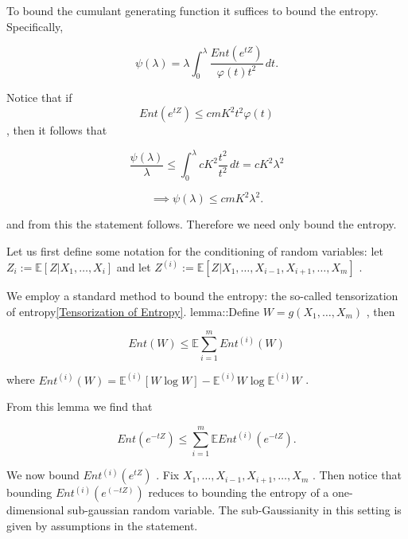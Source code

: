 \documentclass{article}
\begin{document}
\begin{lemma}
\label{Herbst's Argument}
To bound the cumulant generating function it suffices to bound the entropy. Specifically,


\begin{equation*}
\psi(\lambda) =\lambda \int_0^\lambda  \frac{Ent(e^{tZ})}{\varphi(t)t^2}  \, dt.
\end{equation*}


\end{lemma}
 Notice that if  
\begin{equation*}
Ent(e^{tZ}) \leq cmK^2 t^2 \varphi(t)
\end{equation*}
 , then it follows that


\begin{equation*}
\frac{\psi(\lambda)}{\lambda} \leq \int _0^\lambda cK^2 \frac{t^2}{t^2} \, dt = cK^2 \lambda^2
\end{equation*}


\begin{equation*}
\implies \psi(\lambda) \leq cmK^2 \lambda^2.
\end{equation*}

and from this the statement follows. Therefore we need only bound the entropy.

Let us first define some notation for the conditioning of random variables: let  $Z_i := \mathbb{E}[Z |X_1, \dots, X_i]$  and let  $Z^{(i)}:= \mathbb{E}[Z|X_1, \dots, X_{i-1}, X_{i+1}, \dots, X_m]$ .

We employ a standard method to bound the entropy: the so-called tensorization of entropy\ref{Tensorization of Entropy}. lemma::Define  $W = g(X_1, \dots, X_m)$ , then


\begin{equation*}
Ent(W) \leq \mathbb{E} \sum_{i=1}^m Ent^{(i)}(W)
\end{equation*}

where  $Ent^{(i)}(W) = \mathbb{E}^{(i)}[W \log W] - \mathbb{E}^{(i)}W \log \mathbb{E}^{(i)}W$ .

 From this lemma we find that


\begin{equation*}
Ent(e^{-tZ}) \leq \sum_{i=1}^m \mathbb{E} Ent^{(i)}(e^{-tZ}).
\end{equation*}

We now bound  $Ent^{(i)}(e^{tZ})$ . Fix  $X_1, \dots, X_{i-1}, X_{i+1},\dots, X_m$ . Then notice that bounding  $Ent^{(i)}(e^{(-tZ)})$  reduces to bounding the entropy of a one-dimensional sub-gaussian random variable. The sub-Gaussianity in this setting is given by assumptions in the statement.
\end{document}
